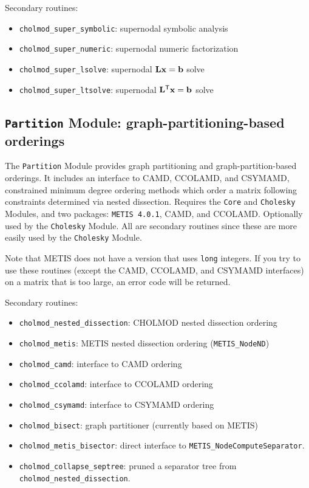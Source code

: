 \documentclass[11pt]{article}
\newcommand{\m}[1]{{\bf{#1}}}       %
\newcommand{\tr}{^{\sf T}}          %
\begin{document}
\vspace{0.1in}
\noindent Secondary routines:
    \begin{itemize}
    \item {\tt cholmod\_super\_symbolic}: supernodal symbolic analysis
    \item {\tt cholmod\_super\_numeric}: supernodal numeric factorization
    \item {\tt cholmod\_super\_lsolve}: supernodal $\m{Lx}=\m{b}$ solve
    \item {\tt cholmod\_super\_ltsolve}: supernodal $\m{L}\tr\m{x}=\m{b}$ solve
    \end{itemize}

\subsection{{\tt Partition} Module: graph-partitioning-based orderings}

The {\tt Partition} Module provides
graph partitioning and graph-partition-based orderings.  It includes an
interface to CAMD, CCOLAMD, and CSYMAMD, constrained minimum degree ordering
methods which order a matrix following constraints determined via nested
dissection.
Requires the {\tt Core} and {\tt Cholesky} Modules, and two packages: {\tt METIS 4.0.1}, CAMD, and CCOLAMD.
Optionally used by the {\tt Cholesky} Module.  All are secondary routines since
these are more easily used by the {\tt Cholesky} Module.

Note that METIS does not have a version that uses {\tt long} integers.  If you try to use
these routines (except the CAMD, CCOLAMD, and CSYMAMD interfaces)
on a matrix that is too large, an error code will be returned.

\vspace{0.1in}
\noindent Secondary routines:
    \begin{itemize}
    \item {\tt cholmod\_nested\_dissection}: CHOLMOD nested dissection ordering
    \item {\tt cholmod\_metis}: METIS nested dissection ordering ({\tt METIS\_NodeND})
    \item {\tt cholmod\_camd}: interface to CAMD ordering
    \item {\tt cholmod\_ccolamd}: interface to CCOLAMD ordering
    \item {\tt cholmod\_csymamd}: interface to CSYMAMD ordering
    \item {\tt cholmod\_bisect}: graph partitioner (currently based on METIS)
    \item {\tt cholmod\_metis\_bisector}: direct interface to {\tt METIS\_NodeComputeSeparator}.
    \item {\tt cholmod\_collapse\_septree}: pruned a separator tree from
    {\tt cholmod\_nested\_dissection}.
    \end{itemize}
\end{document}
